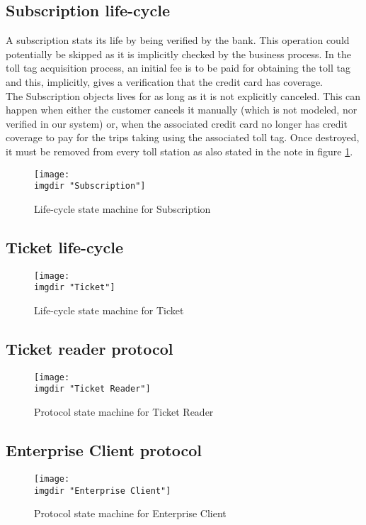 \subsection{Subscription life-cycle}
A subscription stats its life by being verified by the bank. This operation could potentially be skipped as it is implicitly checked by the business process. In the toll tag acquisition process, an initial fee is to be paid for obtaining the toll tag and this, implicitly, gives a verification that the credit card has coverage.\\
The Subscription objects lives for as long as it is not explicitly canceled. This can happen when either the customer cancels it manually (which is not modeled, nor verified in our system) or, when the associated credit card no longer has credit coverage to pay for the trips taking using the associated toll tag. Once destroyed, it must be removed from every toll station as also stated in the note in figure \ref{fig:lsm:subscription}.
\begin{figure}
  \centering
  \texttt{[image: \\imgdir "Subscription"]}
  \caption{Life-cycle state machine for Subscription}
  \label{fig:lsm:subscription}
\end{figure}

\subsection{Ticket life-cycle}
\begin{figure}
  \centering
  \texttt{[image: \\imgdir "Ticket"]}
  \caption{Life-cycle state machine for Ticket}
  \label{fig:lsm:ticket}
\end{figure}

\subsection{Ticket reader protocol}
\begin{figure}
  \centering
  \texttt{[image: \\imgdir "Ticket Reader"]}
  \caption{Protocol state machine for Ticket Reader}
  \label{fig:lsm:ticket_reader}
\end{figure}

\subsection{Enterprise Client protocol}
\begin{figure}
  \centering
  \texttt{[image: \\imgdir "Enterprise Client"]}
  \caption{Protocol state machine for Enterprise Client}
  \label{fig:lsm:enterprise_client}
\end{figure}

